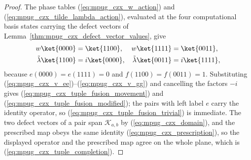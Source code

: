 \begin{proof}\leanok
    The phase tables (\ref{eq:mpug_czx_w_action}) and
    (\ref{eq:mpug_czx_tilde_lambda_action}), evaluated at the four
    computational basis states carrying the defect vectors of
    Lemma~\ref{thm:mpug_czx_defect_vector_values}, give
    \begin{align}
        w\ket{0000}             & =\ket{1100},
                                & w\ket{1111}
                                & =\ket{0011},
        \label{eq:mpug_czx_w_basis_action}                \\
        \tilde\lambda\ket{1100} & =i\ket{0000},
                                & \tilde\lambda\ket{0011}
                                & =i\ket{1111},
        \label{eq:mpug_czx_tilde_lambda_basis_action}
    \end{align}
    because $e(0000)=e(1111)=0$ and $f(1100)=f(0011)=1$. Substituting
    (\ref{eq:mpug_czx_v_ee})--(\ref{eq:mpug_czx_v_gg}) and cancelling the
    factors $-i$ gives (\ref{eq:mpug_czx_tuple_fusion_movement}) and
    (\ref{eq:mpug_czx_tuple_fusion_modified}); the pairs with left label $e$
    carry the identity operator, so
    (\ref{eq:mpug_czx_tuple_fusion_trivial}) is immediate. The two defect
    vectors of a pair span $\mathcal K_{a,b}$ by (\ref{eq:mpug_czx_domain}),
    and the prescribed map obeys the same identity
    (\ref{eq:mpug_czx_prescription}), so the displayed operator and the
    prescribed map agree on the whole plane, which is
    (\ref{eq:mpug_czx_tuple_completion}).
\end{proof}

